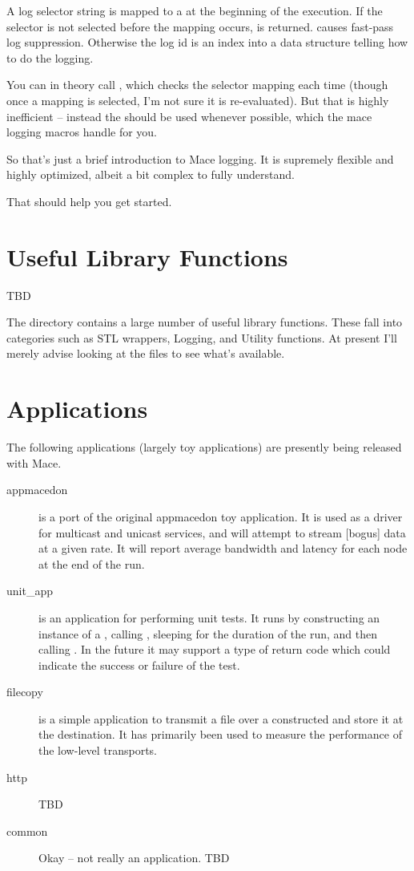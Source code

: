 A log selector string is mapped to a  at the beginning of the
execution.  If the selector is not selected before the mapping occurs,
 is returned.   causes fast-pass log suppression.   Otherwise the
log id is an index into a data structure telling how to do the logging.

You can in theory call , which checks the
selector mapping each time (though once a mapping is selected, I'm not
sure it is re-evaluated).  But that is highly inefficient -- instead the
 should be used whenever possible, which the mace logging macros
handle for you.

So that's just a brief introduction to Mace logging.  It is supremely
flexible and highly optimized, albeit a bit complex to fully understand.

That should help you get started.


\section{Useful Library Functions}
\label{sec:lib}
TBD %

The  directory contains a large number of useful library functions.
These fall into categories such as STL wrappers, Logging, and Utility functions.  At
present I'll merely advise looking at the  files to see what's available.

\section{Applications}
\label{sec:applications}
The following applications (largely toy applications) are presently being released 
with Mace.  

\begin{description}
\item[appmacedon]  is a port of the original appmacedon toy 
  application.  It is used as a driver for multicast and unicast services, and will
  attempt to stream [bogus] data at a given rate.  It will report average bandwidth
  and latency for each node at the end of the run.
\item[unit\_app]  is an application for performing unit tests.
  It runs by constructing an instance of a , calling
  , sleeping for the duration of the run, and then calling
  .  In the future it may support a type of return code which 
  could indicate the success or failure of the test.
\item[filecopy]  is a simple application to transmit a file
  over a constructed  and store it at the destination.
  It has primarily been used to measure the performance of the low-level transports.
\item[http] TBD %
\item[common] Okay -- not really an application. TBD %
\end{description}


